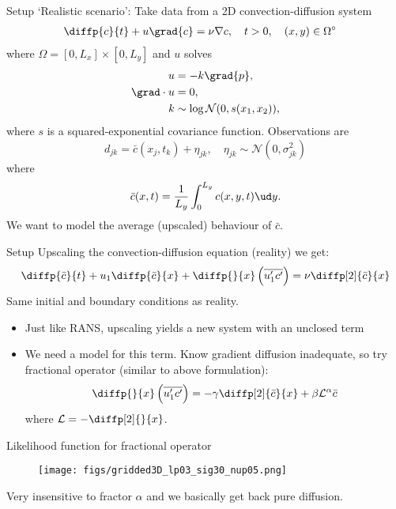 \begin{frame}{Setup}
  `Realistic scenario': Take data from a 2D convection-diffusion system
  \begin{align*}
    \diffp{c}{t} + u \grad{c} &= \nu \nabla{c}, \quad t > 0,
    \quad (x, y) \in \Omega^\circ
  \end{align*}
  where $\Omega = [0, L_x] \times [0, L_y]$ and $u$ solves
  \begin{align*}
    u &= -k \grad{p}, \\
    \grad \cdot u &= 0, \\
    k &\sim \log \mathcal{N}(0, s(x_1, x_2)),
  \end{align*}
  where $s$ is a squared-exponential covariance function.  Observations are
  \begin{equation*}
    d_{jk} = \bar{c}(x_j, t_k) + \eta_{jk},
    \quad \eta_{jk} \sim \mathcal{N}(0, \sigma_{jk}^2)
  \end{equation*}
  where
  \begin{equation*}
    \bar{c}(x, t) = \frac{1}{L_y} \int_{0}^{L_y} c(x, y, t) \ud y.
  \end{equation*}
  We want to model the average (upscaled) behaviour of $\bar{c}$.
\end{frame}

\begin{frame}{Setup}
  Upscaling the convection-diffusion equation (reality) we get:
  \begin{equation*}
    \diffp{\bar{c}}{t} + u_1 \diffp{\bar{c}}{x} + \diffp{}{x}\left(\overline{u_1' c'}\right) = \nu \diffp[2]{\bar{c}}{x}
  \end{equation*}
  Same initial and boundary conditions as reality.
  \begin{itemize}
    \item Just like RANS, upscaling yields a new system with an unclosed term
    \item We need a model for this term.  Know gradient diffusion inadequate, so
      try fractional operator (similar to above formulation):
      \begin{equation*}
        \diffp{ }{x}\left(\overline{u_1' c'}\right) = -\gamma \diffp[2]{\bar{c}}{x} + \beta \mathcal{L}^{\alpha} \bar{c}
      \end{equation*}
      where $\mathcal{L} = -\diffp[2]{ }{x}$.
  \end{itemize}
\end{frame}

\begin{frame}{Likelihood function for fractional operator}
  \begin{figure}
    \centering
    \texttt{[image: figs/gridded3D\_lp03\_sig30\_nup05.png]}
  \end{figure}
  Very insensitive to fractor $\alpha$ and we basically get back pure diffusion.
\end{frame}

